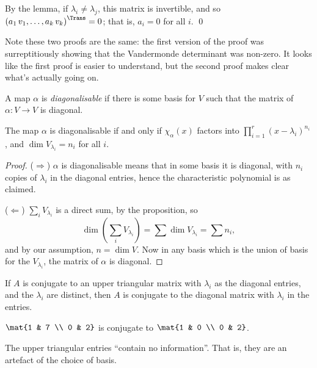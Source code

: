 By the lemma, if $\lambda_i\neq \lambda_j$, this matrix is invertible, and so $\left(a_1 \, v_1, \ldots, a_k \, v_k\right)^\Trans=0$; that is, $a_i=0$ for all $i$. \qed

Note these two proofs are the same: the first version of the proof was surreptitiously showing that the Vandermonde determinant was non-zero. It looks like the first proof is easier to understand, but the second proof makes clear what's actually going on.

	\pagebreak

\begin{definition}
	A map $\alpha$ is \emph{diagonalisable} if there is some basis for $V$ such that the matrix of $\alpha:V\to V$ is diagonal.
\end{definition}

\begin{corollary}
	The map $\alpha$ is diagonalisable if and only if $\chi_\alpha(x)$ factors into $\prod_{i=1}^r \left( x-\lambda_i \right)^{n_i}$, and $\dim V_{\lambda_i} = n_i$ for all $i$.
\end{corollary}

\begin{proof}
	($\Rightarrow$) $\alpha$ is diagonalisable means that in some basis it is diagonal, with $n_i$ copies of $\lambda_i$ in the diagonal entries, hence the characteristic polynomial is as claimed.
	
	($\Leftarrow$) $\sum_i V_{\lambda_i}$ is a direct sum, by the proposition, so
	\begin{equation*}
		\textstyle
		\dim\left( \sum_i V_{\lambda_i} \right)
		= \sum \dim V_{\lambda_i}
		= \sum n_i,
	\end{equation*}
	and by our assumption, $n=\dim V$. Now in any basis which is the union of basis for the $V_{\lambda_i}$, the matrix of $\alpha$ is diagonal.
\end{proof}

\begin{corollary}
	If $A$ is conjugate to an upper triangular matrix with $\lambda_i$ as the diagonal entries, and the $\lambda_i$ are distinct, then $A$ is conjugate to the diagonal matrix with $\lambda_i$ in the entries.
\end{corollary}

\begin{example}
	$\mat{1 & 7 \\ 0 & 2}$ is conjugate to $\mat{1 & 0 \\ 0 & 2}$.
	
	The upper triangular entries ``contain no information''. That is, they are an artefact of the choice of basis.
\end{example}

